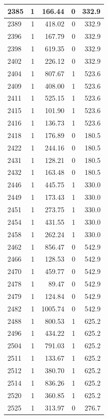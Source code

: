 \documentclass[
  12pt,
]{book}
\begin{document}
\begin{tabular}{l|r|r|r|r}
\hline
2385 & 1 & 166.44 & 0 & 332.9\\
\hline
2389 & 1 & 418.02 & 0 & 332.9\\
\hline
2396 & 1 & 167.79 & 0 & 332.9\\
\hline
2398 & 1 & 619.35 & 0 & 332.9\\
\hline
2402 & 1 & 226.12 & 0 & 332.9\\
\hline
2404 & 1 & 807.67 & 1 & 523.6\\
\hline
2409 & 1 & 408.00 & 1 & 523.6\\
\hline
2411 & 1 & 525.15 & 1 & 523.6\\
\hline
2415 & 1 & 101.90 & 1 & 523.6\\
\hline
2416 & 1 & 136.73 & 1 & 523.6\\
\hline
2418 & 1 & 176.89 & 0 & 180.5\\
\hline
2422 & 1 & 244.16 & 0 & 180.5\\
\hline
2431 & 1 & 128.21 & 0 & 180.5\\
\hline
2432 & 1 & 163.48 & 0 & 180.5\\
\hline
2446 & 1 & 445.75 & 1 & 330.0\\
\hline
2449 & 1 & 173.43 & 1 & 330.0\\
\hline
2451 & 1 & 273.75 & 1 & 330.0\\
\hline
2454 & 1 & 431.55 & 1 & 330.0\\
\hline
2458 & 1 & 262.24 & 1 & 330.0\\
\hline
2462 & 1 & 856.47 & 0 & 542.9\\
\hline
2466 & 1 & 128.53 & 0 & 542.9\\
\hline
2470 & 1 & 459.77 & 0 & 542.9\\
\hline
2478 & 1 & 89.47 & 0 & 542.9\\
\hline
2479 & 1 & 124.84 & 0 & 542.9\\
\hline
2482 & 1 & 1005.74 & 0 & 542.9\\
\hline
2488 & 1 & 800.53 & 1 & 625.2\\
\hline
2496 & 1 & 434.22 & 1 & 625.2\\
\hline
2504 & 1 & 791.03 & 1 & 625.2\\
\hline
2511 & 1 & 133.67 & 1 & 625.2\\
\hline
2512 & 1 & 380.70 & 1 & 625.2\\
\hline
2514 & 1 & 836.26 & 1 & 625.2\\
\hline
2520 & 1 & 360.85 & 1 & 625.2\\
\hline
2525 & 1 & 313.97 & 0 & 276.7\\

\end{tabular}
\end{document}
